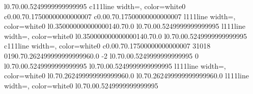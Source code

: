 \documentclass{standalone}
\begin{document}
\begin{knitdiagram}
{l}{0.7}{0.0}{0.5249999999999995}
{c}{1}{1}{1}{line width=\outlineThickness*\dx, color=white}{0}
{c}{0.0}{0.7}{0.17500000000000007}
{c}{0.0}{0.7}{0.17500000000000007}
{l}{1}{1}{1}{line width=\outlineThickness*\dx, color=white}{0}
{l}{0.35000000000000014}{0.7}{0.0}
{l}{0.7}{0.0}{0.5249999999999995}
{l}{1}{1}{1}{line width=\outlineThickness*\dx, color=white}{0}
{l}{0.35000000000000014}{0.7}{0.0}
{l}{0.7}{0.0}{0.5249999999999995}
{c}{1}{1}{1}{line width=\outlineThickness*\dx, color=white}{0}
{c}{0.0}{0.7}{0.17500000000000007}
{3}{1}{0}{18}
{0}{19}{0.7}{0.26249999999999996}{0.0}
{-2}
{l}{0.7}{0.0}{0.5249999999999995}
{0}
{l}{0.7}{0.0}{0.5249999999999995}
{l}{0.7}{0.0}{0.5249999999999995}
{l}{1}{1}{1}{line width=\outlineThickness*\dx, color=white}{0}
{l}{0.7}{0.26249999999999996}{0.0}
{l}{0.7}{0.26249999999999996}{0.0}
{l}{1}{1}{1}{line width=\outlineThickness*\dx, color=white}{0}
{l}{0.7}{0.0}{0.5249999999999995}
\end{knitdiagram}
\end{document}
